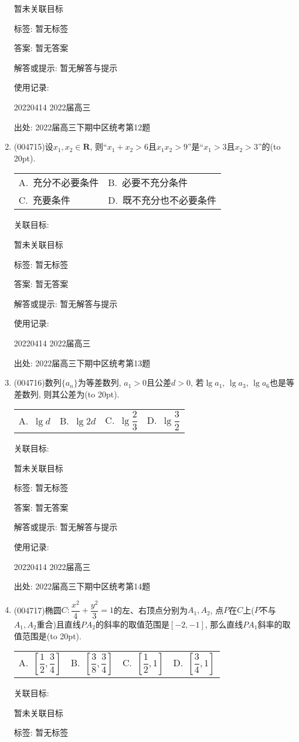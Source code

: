 \documentclass[10pt,a4paper]{article}
\newcommand{\bracket}[1]{(\hbox to #1pt{})}
\newcommand{\twoch}[4]{\par\begin{tabular}{p{.46\textwidth}p{.46\textwidth}}
A.~#1& B.~#2\\
C.~#3& D.~#4
\end{tabular}}
\newcommand{\fourch}[4]{\par\begin{tabular}{p{.23\textwidth}p{.23\textwidth}p{.23\textwidth}p{.23\textwidth}}
A.~#1 &B.~#2& C.~#3& D.~#4
\end{tabular}}
\begin{document}
\begin{enumerate}[1.]
暂未关联目标



标签: 暂无标签

答案: 暂无答案

解答或提示: 暂无解答与提示

使用记录:

20220414	2022届高三	


出处: 2022届高三下期中区统考第12题
\item { (004715)}设$x_1,x_2\in \mathbf{R}$, 则``$x_1+x_2>6$且$x_1x_2>9$''是``$x_1>3$且$x_2>3$''的\bracket{20}.
\twoch{充分不必要条件}{必要不充分条件}{充要条件}{既不充分也不必要条件}


关联目标:

暂未关联目标



标签: 暂无标签

答案: 暂无答案

解答或提示: 暂无解答与提示

使用记录:

20220414	2022届高三	


出处: 2022届高三下期中区统考第13题
\item { (004716)}数列$\{a_n\}$为等差数列, $a_1>0$且公差$d>0$, 若$\lg a_1$, $\lg a_3$, $\lg a_6$也是等差数列, 则其公差为\bracket{20}.
\fourch{$\lg d$}{$\lg 2d$}{$\lg \dfrac 23$}{$\lg \dfrac 32$}


关联目标:

暂未关联目标



标签: 暂无标签

答案: 暂无答案

解答或提示: 暂无解答与提示

使用记录:

20220414	2022届高三	


出处: 2022届高三下期中区统考第14题
\item { (004717)}椭圆$C:\dfrac{x^2}{4}+\dfrac{y^2}{3}=1$的左、右顶点分别为$A_1,A_2$, 点$P$在$C$上($P$不与$A_1,A_2$重合)且直线$PA_2$的斜率的取值范围是$[-2,-1]$, 那么直线$PA_1$斜率的取值范围是\bracket{20}.
\fourch{$[\dfrac 12,\dfrac 34]$}{$[\dfrac 38,\dfrac 34]$}{$[\dfrac 12, 1]$}{$[\dfrac 34,1]$}


关联目标:

暂未关联目标



标签: 暂无标签


\end{enumerate}
\end{document}
